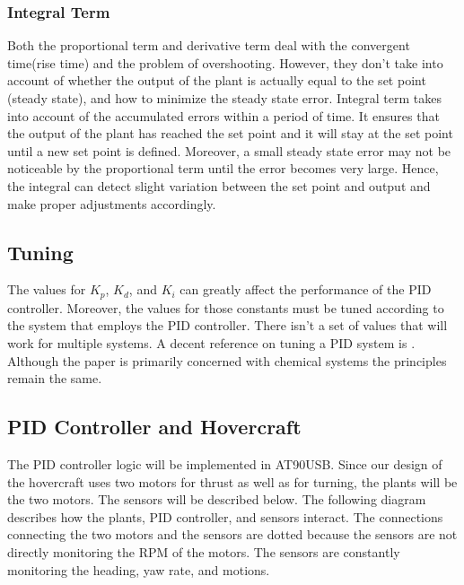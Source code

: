 \subsubsection{Integral Term}
Both the proportional term and derivative term deal with the convergent
time(rise time) and the problem of overshooting. However, they don't take into
account of whether the output of the plant is actually equal to the set point
(steady state), and how to minimize the steady state error. Integral term takes
into account of the accumulated errors within a period of time. It ensures that
the output of the plant has reached the set point and it will stay at the set
point until a new set point is defined. Moreover, a small steady state error may
not be noticeable by the proportional term until the error becomes very large.
Hence, the integral can detect slight variation between the set point and output
and make proper adjustments accordingly. 

\subsection{Tuning}
The values for $K_p$, $K_d$, and $K_i$ can greatly affect the performance of the
PID controller. Moreover, the values for those constants must be tuned according
to the system that employs the PID controller. There isn't a set of values that
will work for multiple systems.  A decent reference on tuning a PID system is
\cite{Skogestad2003291}.  Although the paper is primarily concerned with
chemical systems the principles remain the same.  

\subsection{PID Controller and Hovercraft}
The PID controller logic will be implemented in AT90USB. Since our design of the
hovercraft uses two motors for thrust as well as for turning, the plants will be
the two motors. The sensors will be described below. The following diagram
describes how the plants, PID controller, and sensors interact. The connections
connecting the two motors and the sensors are dotted because the sensors are not
directly monitoring the RPM of the motors. The sensors are constantly monitoring
the heading, yaw rate, and motions. 

